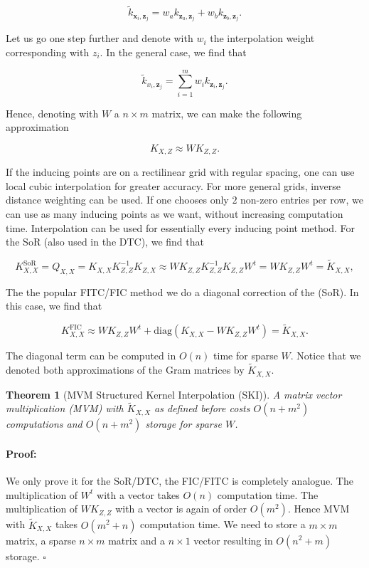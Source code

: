 \documentclass[12pt,a4paper,oneside]{book}
\newtheorem{Theorem}{Theorem}
\newenvironment{proof}{\paragraph{Proof:}}{\hfill$\square$}
\begin{document}
\begin{equation}
\tilde{k}_{\bm{x}_i,\bm{z}_j} = w_a k_{\bm{z}_a,\bm{z}_j} + w_b k_{\bm{z}_b,\bm{z}_j}.
\end{equation}

Let us go one step further and denote with $w_i$ the interpolation weight corresponding with $z_{i}$. In the general case, we find that 

\begin{equation}\label{interpolsation_1d}
\tilde{k}_{x_i,\bm{z}_j} = \sum_{i=1}^m w_i k_{\bm{z}_i,\bm{z}_j}.
\end{equation}

Hence, denoting with $W$ a $n\times m$ matrix, we can make the following approximation 

\begin{equation}
K_{X,Z} \approx W K_{Z,Z}.
\end{equation}

If the inducing points are on a rectilinear grid with regular spacing, one can use local cubic interpolation for greater accuracy. For more general grids, inverse distance weighting can be used. If one chooses only $2$ non-zero entries per row, we can use as many inducing points as we want, without increasing computation time. Interpolation can be used for essentially every inducing point method. For the SoR (also used in the DTC), we find that 

\begin{equation}
K_{X,X}^{\text{SoR}}= Q_{X,X} = K_{X,X} K_{Z,Z}^{-1} K_{Z,X} \approx W  K_{Z,Z}  K_{Z,Z}^{-1}  K_{Z,Z} W^t = W K_{Z,Z} W^t = \tilde{K}_{X,X},
\end{equation}

The the popular FITC/FIC method we do a diagonal correction of the (SoR). In this case, we find that 

\begin{equation}
K_{X,X}^{\text{FIC}} \approx W K_{Z,Z} W^t + \text{diag}(  K_{X,X} - W K_{Z,Z} W^t) =\tilde{K}_{X,X}.
\end{equation}


The diagonal term can be computed in $O(n)$ time for sparse $W$. Notice that we denoted both approximations of the Gram matrices by $\tilde{K}_{X,X}$. 

\begin{Theorem}[MVM Structured Kernel Interpolation (SKI)]\label{SKI_theorem}
A matrix vector multiplication (MVM) with $\tilde{K}_{X,X}$ as defined before costs $O(n+m^2)$ computations and $O(n+m^2)$ storage for sparse $W$. 
\end{Theorem}
\begin{proof}
We only prove it for the SoR/DTC, the FIC/FITC is completely analogue. The multiplication of $W^t$ with a vector takes $O(n)$ computation time. The multiplication of $W K_{Z,Z}$ with a vector is again of order $O(m^2)$. Hence MVM with $\tilde{K}_{X,X}$ takes $O(m^2 +n)$ computation time. We need to store a $m \times m$ matrix, a sparse $n \times m$ matrix and a $n \times 1$ vector resulting in $O(n^2 +m)$ storage.
\end{proof}
\end{document}
